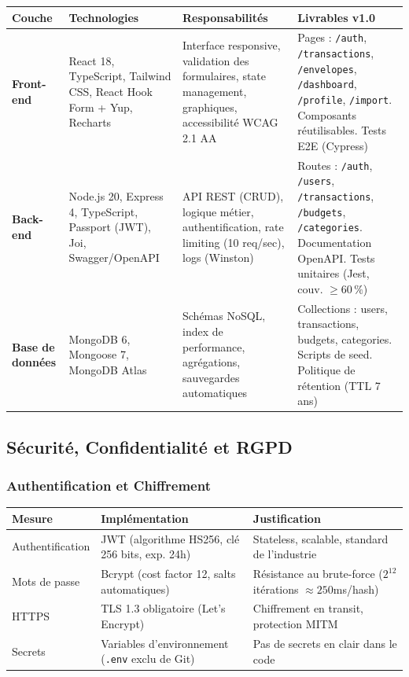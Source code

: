 \begin{center}
\scriptsize
\begin{tabular}{|p{2cm}|p{3.5cm}|p{4cm}|p{4cm}|}
\hline
\textbf{Couche} & \textbf{Technologies} & \textbf{Responsabilités} & \textbf{Livrables v1.0} \\
\hline
\textbf{Front-end} & React 18, TypeScript, Tailwind CSS, React Hook Form + Yup, Recharts & Interface responsive, validation des formulaires, state management, graphiques, accessibilité WCAG 2.1 AA & Pages : \texttt{/auth}, \texttt{/transactions}, \texttt{/envelopes}, \texttt{/dashboard}, \texttt{/profile}, \texttt{/import}. Composants réutilisables. Tests E2E (Cypress) \\
\hline
\textbf{Back-end} & Node.js 20, Express 4, TypeScript, Passport (JWT), Joi, Swagger/OpenAPI & API REST (CRUD), logique métier, authentification, rate limiting (10 req/sec), logs (Winston) & Routes : \texttt{/auth}, \texttt{/users}, \texttt{/transactions}, \texttt{/budgets}, \texttt{/categories}. Documentation OpenAPI. Tests unitaires (Jest, couv. $\geq 60\,\%$) \\
\hline
\textbf{Base de données} & MongoDB 6, Mongoose 7, MongoDB Atlas & Schémas NoSQL, index de performance, agrégations, sauvegardes automatiques & Collections : users, transactions, budgets, categories. Scripts de seed. Politique de rétention (TTL 7 ans) \\
\hline
\end{tabular}
\end{center}

\subsection{Sécurité, Confidentialité et RGPD}

\subsubsection{Authentification et Chiffrement}

\begin{center}
\begin{tabular}{|p{3.5cm}|p{5cm}|p{5cm}|}
\hline
\textbf{Mesure} & \textbf{Implémentation} & \textbf{Justification} \\
\hline
Authentification & JWT (algorithme HS256, clé 256 bits, exp. 24h) & Stateless, scalable, standard de l'industrie \\
\hline
Mots de passe & Bcrypt (cost factor 12, salts automatiques) & Résistance au brute-force ($2^{12}$ itérations $\approx 250$ms/hash) \\
\hline
HTTPS & TLS 1.3 obligatoire (Let's Encrypt) & Chiffrement en transit, protection MITM \\
\hline
Secrets & Variables d'environnement (\texttt{.env} exclu de Git) & Pas de secrets en clair dans le code \\
\hline
\end{tabular}
\end{center}

